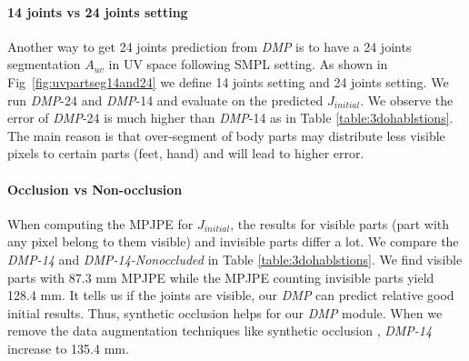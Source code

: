 \documentclass[10pt,twocolumn,letterpaper]{article}
\begin{document}
\paragraph{14 joints vs 24 joints setting} Another way to get 24 joints prediction from \textit{DMP} is to have a 24 joints segmentation $A_{uv}$ in UV space following SMPL setting. As shown in Fig~\ref{fig:uvpartseg14and24} we define 14 joints setting and 24 joints setting. We run \textit{DMP}-24 and  \textit{DMP}-14 and evaluate on the predicted $J_{initial}$. We observe the error of \textit{DMP}-24 is much higher than  \textit{DMP}-14 as in Table \ref{table:3dohablstions}. The main reason is that over-segment of body parts may distribute less visible pixels to certain parts (feet, hand) and will lead to  higher error.  



\paragraph{Occlusion vs Non-occlusion} When computing the MPJPE for $J_{initial}$, the results for visible parts (part with any pixel belong to them visible) and invisible parts  differ a lot. We compare the \textit{DMP-14} and \textit{DMP-14-Nonoccluded} in Table \ref{table:3dohablstions}. We find visible parts with 87.3 mm MPJPE while the MPJPE counting invisible parts yield 128.4 mm. It tells us if the joints are visible, our \textit{DMP} can predict relative good initial results. Thus, synthetic occlusion helps for  our \textit{DMP} module.
When we remove the data augmentation techniques like synthetic occlusion \cite{SyntheticOcclusion}, \textit{DMP-14} increase to 135.4 mm. 
\end{document}
